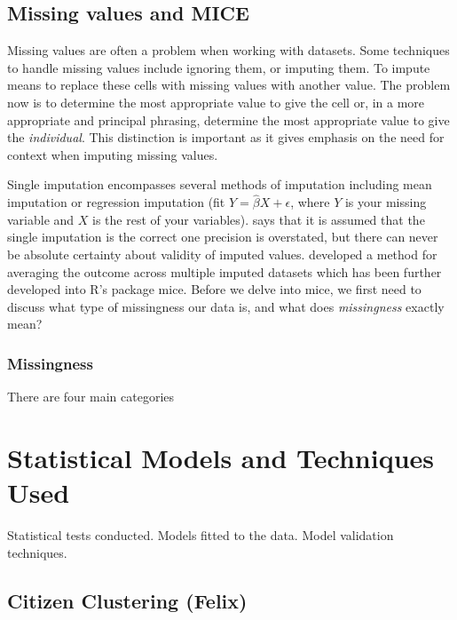 \documentclass[12pt]{article}
\begin{document}
\subsection{Missing values and MICE}
		
		Missing values are often a problem when working with datasets. Some techniques to handle missing values include ignoring them, or imputing them. To impute means to replace these cells with missing values with another value. The problem now is to determine the most appropriate value to give the cell or, in a more appropriate and principal phrasing, determine the most appropriate value to give the \emph{individual}. This distinction is important as it gives emphasis on the need for context when imputing missing values.
		
		Single imputation encompasses several methods of imputation including mean imputation or regression imputation (fit $Y= \widehat\beta X + \epsilon$, where $Y$ is your missing variable and $X$ is the rest of your variables). \cite{jadhav1} says that it is assumed that the single imputation is the correct one precision is overstated, but there can never be absolute certainty about validity of imputed values. \cite{rubin1} developed a method for averaging the outcome across multiple imputed datasets which has been further developed into \textsf{R}'s package \textsf{mice}. Before we delve into \textsf{mice}, we first need to discuss what type of missingness our data is, and what does \emph{missingness} exactly mean?
		
		\subsubsection{Missingness}
		
		There are four main categories 

\section{Statistical Models and Techniques Used}

Statistical tests conducted.
Models fitted to the data.
Model validation techniques.


\subsection{Citizen Clustering (Felix)}
\end{document}
